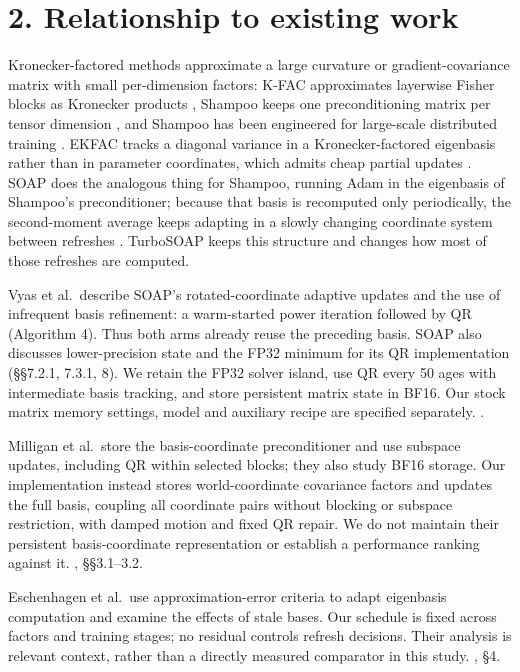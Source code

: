 \hypertarget{relationship-to-existing-work}{%
\section{2. Relationship to existing
work}\label{relationship-to-existing-work}}

Kronecker-factored methods approximate a large curvature or
gradient-covariance matrix with small per-dimension factors: K-FAC
approximates layerwise Fisher blocks as Kronecker products
\citep{martens2015optimizing}, Shampoo keeps one preconditioning matrix
per tensor dimension \citep{gupta2018shampoo}, and Shampoo has been
engineered for large-scale distributed training
\citep{anil2020scalable,shi2023distributed}. EKFAC tracks a diagonal
variance in a Kronecker-factored eigenbasis rather than in parameter
coordinates, which admits cheap partial updates \citep{george2018fast}.
SOAP does the analogous thing for Shampoo, running Adam \citep{kingma2014adam}
in the eigenbasis of Shampoo's preconditioner; because that basis is
recomputed only periodically, the second-moment average keeps adapting
in a slowly changing coordinate system between refreshes
\citep{vyas2024soap}. TurboSOAP keeps this structure and changes how
most of those refreshes are computed.

Vyas et al.~describe SOAP's rotated-coordinate adaptive updates and the
use of infrequent basis refinement: a warm-started power iteration
followed by QR (Algorithm 4). Thus both arms already reuse the preceding
basis. SOAP also discusses lower-precision state and the FP32 minimum
for its QR implementation (§§7.2.1, 7.3.1, 8). We retain the FP32 solver
island, use QR every 50 ages with intermediate basis tracking, and store
persistent matrix state in BF16. Our stock matrix memory settings, model
and auxiliary recipe are specified separately.
\citep{vyas2024soap}.

Milligan et al.~store the basis-coordinate preconditioner and use
subspace updates, including QR within selected blocks; they also study
BF16 storage. Our implementation instead stores world-coordinate
covariance factors and updates the full basis, coupling all coordinate
pairs without blocking or subspace restriction, with damped motion and
fixed QR repair. We do not maintain their persistent
basis-coordinate representation or establish a performance ranking
against it. \citep{milligan2026reparametrizing}, §§3.1--3.2.

Eschenhagen et al.~use approximation-error criteria to adapt eigenbasis
computation and examine the effects of stale bases. Our schedule is
fixed across factors and training stages; no residual controls refresh
decisions. Their analysis is relevant context, rather than a directly
measured comparator in this study.
\citep{eschenhagen2025purifying}, §4.

